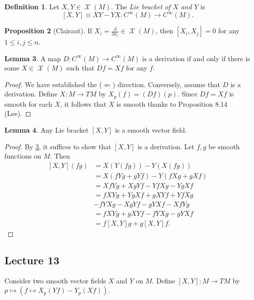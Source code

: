 \documentclass[10pt,letterpaper,cm]{nupset}
\theoremstyle{definition}
\newtheorem{definition}{Definition}[subsection]
\theoremstyle{theorem}
\newtheorem{lemma}[definition]{Lemma}
\newtheorem{prop}[definition]{Proposition}
\theoremstyle{remark}
\newcommand{\1}{\mathbf{1}}
\newcommand{\0}{\vec 0}
\DeclareMathOperator{\vf}{\mathscr{X}}
\begin{document}
\begin{definition}
Let $X, Y \in \vf(M)$. The \textit{Lie bracket of $X$ and $Y$} is $$\left[X, Y\right] \equiv  XY - YX : C^{\infty}(M)\to C^{\infty}(M).$$
\end{definition}

\begin{prop}[Clairaut]
If $X_i = \frac{\partial}{\partial{x_i}}\in \vf(M)$, then $\left[X_i, X_j\right] = 0$ for any $1\leq i,j \leq n$.
\end{prop}

\begin{lemma}\label{deriv}
A map $D: C^{\infty}(M) \to C^{\infty}(M)$ is a derivation if and only if there is some $X \in \vf(M)$ such that $Df = Xf$ for any $f$.
\end{lemma}
\begin{proof}
We have established the ($\Longleftarrow$) direction. Conversely, assume that $D$ is a derivation. Define $X : M \to TM$ by $X_p(f) = \left(Df\right)(p)$. Since $Df = Xf$ is smooth for each $X$, it follows that $X$ is smooth thanks to Proposition 8.14 (Lee).
\end{proof}

\begin{lemma}
Any Lie bracket $\left[X, Y\right]$ is a smooth vector field.
\end{lemma}
\begin{proof}
By \cref{deriv}, it suffices to show that $\left[X, Y\right]$ is a derivation. Let $f, g$ be smooth functions on $M$. Then
\begin{align*}
 \left[X, Y\right](fg) & = X(Y(fg)) - Y(X(fg)) 
 \\ & =  X(fYg + gYf) - Y(fXg + gXf) 
 \\ & = XfYg + XgYf - YfXg - YgXf 
 \\ & = fXYg + YgXf + gXYf + YfXg 
 \\ & - fYXg - XgYf - gYXf - XfYg 
 \\ & = fXYg + gXYf - fYXg - gYXf 
 \\ & = f\left[X,Y\right]g + g\left[X,Y\right]f
.\end{align*}
\end{proof}

\subsection{Lecture 13}


Consider two smooth vector fields $X$ and $Y$ on $M$. Define $\left[X, Y\right] : M \to TM$ by $p\mapsto \left(f \mapsto X_p(Yf) - Y_p(Xf)\right)$.
\end{document}
